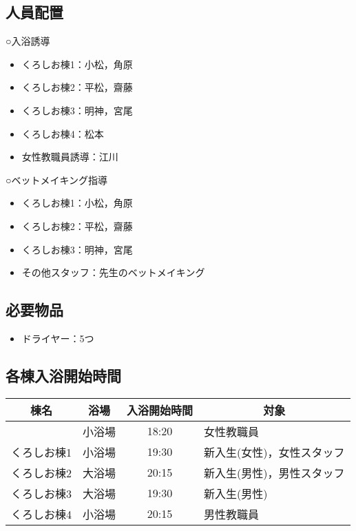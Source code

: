\subsection{人員配置}
○入浴誘導
\begin{itemize}
 \item くろしお棟1：小松，角原
 \item くろしお棟2：平松，齋藤
 \item くろしお棟3：明神，宮尾
 \item くろしお棟4：松本
 \item 女性教職員誘導：江川
\end{itemize}
○ベットメイキング指導
\begin{itemize}
\item くろしお棟1：小松，角原
 \item くろしお棟2：平松，齋藤
 \item くろしお棟3：明神，宮尾
\item その他スタッフ：先生のベットメイキング
\end{itemize}
\subsection{必要物品}
\begin{itemize}
\item ドライヤー：5つ
\end{itemize}

\subsection{各棟入浴開始時間}
\label{sec:bath}
\begin{table}[h]
\begin{tabular}{|c|c|c|l|}
\hline
{棟名}&{浴場}&{入浴開始時間}&\multicolumn{1}{c|}{対象} \\ \hline\hline
           & 小浴場 & 18:20 & 女性教職員 \\ \hline
くろしお棟1 & 小浴場 & 19:30 & 新入生(女性)，女性スタッフ \\ \hline
くろしお棟2 & 大浴場 & 20:15 & 新入生(男性)，男性スタッフ \\ \hline
くろしお棟3 & 大浴場 & 19:30 & 新入生(男性) \\ \hline
くろしお棟4 & 小浴場 & 20:15 & 男性教職員 \\ \hline
\end{tabular}
\end{table}
